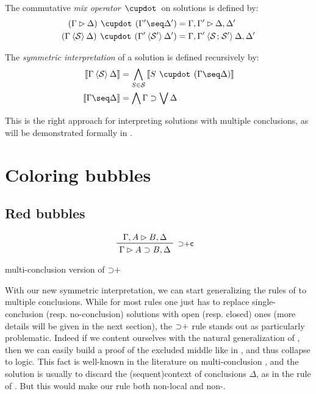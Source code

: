 \begin{scope}
\begin{definition}
  The commutative \emph{mix operator} $\mix$ on solutions is defined by:
  \begin{align*}
    (\Gamma \J \Delta) \mix (\Gamma' \seq \Delta') &=
      \Gamma, \Gamma' \J \Delta, \Delta' \\
    (\Gamma \piq{\cS} \Delta) \mix (\Gamma' \piq{\mathcal{S'}} \Delta') &=
      \Gamma, \Gamma' \piq{\cS \sep \mathcal{S'}} \Delta, \Delta' \\
  \end{align*}
\end{definition}

\begin{definition}
  The \emph{symmetric interpretation} of a solution is defined recursively by:
  \begin{align*}
    \sint{\Gamma \piq{\cS} \Delta} &=
      \bigwedge_{S \in \cS} \sint{S \mix (\Gamma \seq \Delta)} \\
    \sint{\Gamma \seq \Delta} &=
      \bigwedge \Gamma \limp \bigvee \Delta
  \end{align*}
\end{definition}

This is the right approach for interpreting solutions with multiple conclusions,
as will be demonstrated formally in .

\section{Coloring bubbles}

\subsection{Red bubbles}

\begin{marginfigure}
  $$
  \R[\mathsf{{\limp}{+}c}]
    {\Gamma, A \J B, \Delta}
    {\Gamma \J A \limp B, \Delta}
  $$
  \caption{ multi-conclusion version of ${\supset}{+}$}
\end{marginfigure}

With our new symmetric interpretation, we can start generalizing the rules of
 to multiple conclusions. While for most rules one just has to replace
single-conclusion (resp. no-conclusion) solutions with open (resp. closed) ones
(more details will be given in the next section), the ${\supset}{+}$ rule stands
out as particularly problematic. Indeed if we content ourselves with the natural
generalization {} of , then we can
easily build a proof of the excluded middle like in , and thus
collapse to  logic. This fact is well-known in the literature on
multi-conclusion  , and the solution is usually to
discard the \kl(sequent){context} of conclusions $\Delta$, as in the {} rule
of . But this would make our rule both non-local and
non-.


\end{scope}
